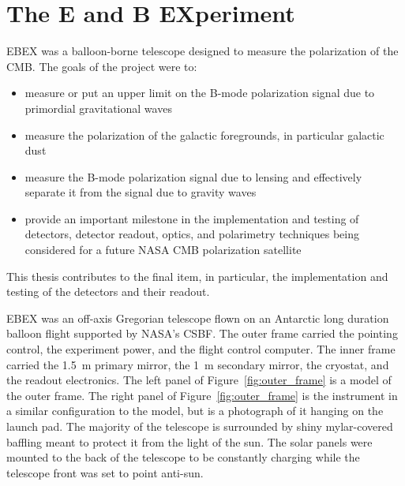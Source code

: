 \section{The E and B EXperiment}
\label{sec:ebex}

\ac{EBEX} was a balloon-borne telescope designed to measure the polarization of the \ac{CMB}.
The goals of the project were to:
\begin{itemize}
\item measure or put an upper limit on the B-mode polarization signal due to primordial gravitational waves%
\item measure the polarization of the galactic foregrounds, in particular galactic dust
\item measure the B-mode polarization signal due to lensing and effectively separate it from the signal due to gravity waves
\item provide an important milestone in the implementation and testing of detectors, detector readout, optics, and polarimetry techniques being considered for a future NASA CMB polarization satellite
\end{itemize}
This thesis contributes to the final item, in particular, the implementation and testing of the detectors and their readout. 

\ac{EBEX} was an off-axis Gregorian
 telescope flown on an Antarctic long duration balloon flight supported by \ac{NASA}'s \ac{CSBF}. 
The outer frame carried the pointing control, the experiment power, and the flight control computer. 
The inner frame carried the 1.5~m primary mirror, the 1~m secondary mirror, the cryostat, and the readout electronics. 
The left panel of Figure~\ref{fig:outer_frame} is a model of the outer frame. 
The right panel of Figure~\ref{fig:outer_frame} is the instrument in a similar configuration to the model, but is a photograph of it hanging on the launch pad. 
The majority of the telescope is surrounded by shiny mylar-covered baffling meant to protect it from the light of the sun. 
The solar panels were mounted to the back of the telescope to be constantly charging while the telescope front was set to point anti-sun. 

